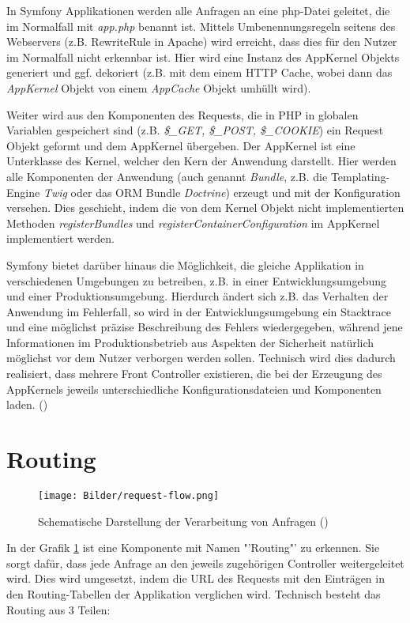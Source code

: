 \documentclass[12pt]{report}
\begin{document}
In Symfony Applikationen werden alle Anfragen an eine php-Datei geleitet, die im Normalfall mit \emph{app.php} benannt ist. Mittels Umbenennungsregeln seitens des Webservers (z.B. RewriteRule in Apache) wird erreicht, dass dies für den Nutzer im Normalfall nicht erkennbar ist. Hier wird eine Instanz des AppKernel Objekts generiert und ggf. dekoriert (z.B. mit dem einem HTTP Cache, wobei dann das \emph{AppKernel} Objekt von einem \emph{AppCache} Objekt umhüllt wird). 

Weiter wird aus den Komponenten des Requests, die in PHP in globalen Variablen gespeichert sind (z.B. \emph{\$\_GET, \$\_POST, \$\_COOKIE}) ein Request Objekt geformt und dem AppKernel übergeben. Der AppKernel ist eine Unterklasse des Kernel, welcher den Kern der Anwendung darstellt. Hier werden alle Komponenten der Anwendung (auch genannt \emph{Bundle}, z.B. die Templating-Engine \emph{Twig} oder das ORM Bundle \emph{Doctrine}) erzeugt und mit der Konfiguration versehen. Dies geschieht, indem die von dem Kernel Objekt nicht implementierten Methoden \emph{registerBundles} und \emph{registerContainerConfiguration} im AppKernel implementiert werden.

Symfony bietet darüber hinaus die Möglichkeit, die gleiche Applikation in verschiedenen Umgebungen zu betreiben, z.B. in einer Entwicklungsumgebung und einer Produktionsumgebung. Hierdurch ändert sich z.B. das Verhalten der Anwendung im Fehlerfall, so wird in der Entwicklungsumgebung ein Stacktrace und eine möglichst präzise Beschreibung des Fehlers wiedergegeben, während jene Informationen im Produktionsbetrieb aus Aspekten der Sicherheit natürlich möglichst vor dem Nutzer verborgen werden sollen. Technisch wird dies dadurch realisiert, dass mehrere Front Controller existieren, die bei der Erzeugung des AppKernels jeweils unterschiedliche Konfigurationsdateien und Komponenten laden.
(\cite{sf2:FrontController})

\section{Routing}

\begin{figure}[htp]
\centering
\texttt{[image: Bilder/request-flow.png]}
\caption{Schematische Darstellung der Verarbeitung von Anfragen (\cite{sf2:HTTPFundamentals})}
\label{fig:RequestFlow}
\end{figure}
In der Grafik \ref{fig:RequestFlow} ist eine Komponente mit Namen "'Routing"' zu erkennen. Sie sorgt dafür, dass jede Anfrage an den jeweils zugehörigen Controller weitergeleitet wird. Dies wird umgesetzt, indem die URL des Requests mit den Einträgen in den Routing-Tabellen der Applikation verglichen wird. Technisch besteht das Routing aus 3 Teilen: 
\end{document}
